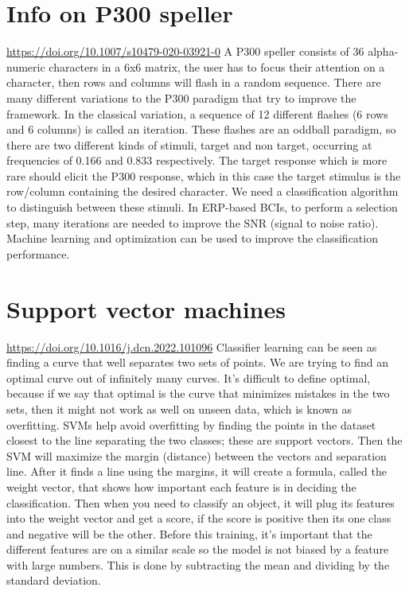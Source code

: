 \documentclass[12pt]{article}
\begin{document}
\section{Info on P300 speller}
\url{https://doi.org/10.1007/s10479-020-03921-0}
A P300 speller consists of 36 alpha-numeric characters in a 6x6 matrix, the user has to focus their attention on a character, then rows and columns will flash in a random sequence. There are many different variations to the P300 paradigm that try to improve the framework. In the classical variation, a sequence of 12 different flashes (6 rows and 6 columns) is called an iteration. These flashes are an oddball paradigm, so there are two different kinds of stimuli, target and non target, occurring at frequencies of 0.166 and 0.833 respectively. The target response which is more rare should elicit the P300 response, which in this case the target stimulus is the row/column containing the desired character. We need a classification algorithm to distinguish between these stimuli. In ERP-based BCIs, to perform a selection step, many iterations are needed to improve the SNR (signal to noise ratio). Machine learning and optimization can be used to improve the classification performance.

\section{Support vector machines}
\url{https://doi.org/10.1016/j.dcn.2022.101096}
Classifier learning can be seen as finding a curve that well separates two sets of points. We are trying to find an optimal curve out of infinitely many curves. It’s difficult to define optimal, because if we say that optimal is the curve that minimizes mistakes in the two sets, then it might not work as well on unseen data, which is known as overfitting. SVMs help avoid overfitting by finding the points in the dataset closest to the line separating the two classes; these are support vectors. Then the SVM will maximize the margin (distance) between the vectors and separation line. After it finds a line using the margins, it will create a formula, called the weight vector, that shows how important each feature is in deciding the classification. Then when you need to classify an object, it will plug its features into the weight vector and get a score, if the score is positive then its one class and negative will be the other. Before this training, it’s important that the different features are on a similar scale so the model is not biased by a feature with large numbers. This is done by subtracting the mean and dividing by the standard deviation.
\end{document}
